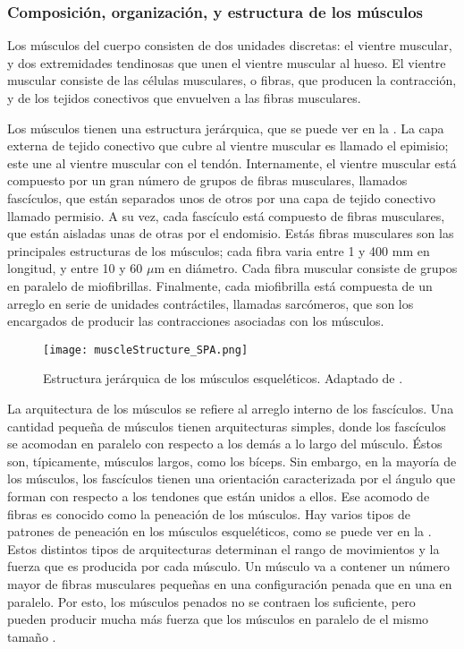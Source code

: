 \subsubsection{Composición, organización, y estructura de los músculos}
\label{sec:muscleComposition}

Los músculos del cuerpo consisten de dos unidades discretas: el vientre muscular, y dos extremidades tendinosas que unen el vientre muscular al hueso. El vientre muscular consiste de las células musculares, o fibras, que producen la contracción, y de los tejidos conectivos que envuelven a las fibras musculares. 

Los músculos tienen una estructura jerárquica, que se puede ver en la . La capa externa de tejido conectivo que cubre al vientre muscular es llamado el epimisio; este une al vientre muscular con el tendón. Internamente, el vientre muscular está compuesto por un gran número de grupos de fibras musculares, llamados fascículos, que están separados unos de otros por una capa de tejido conectivo llamado permisio. A su vez, cada fascículo está compuesto de fibras musculares, que están aisladas unas de otras por el endomisio. Estás fibras musculares son las principales estructuras de los músculos; cada fibra varia entre 1 y 400 mm en longitud, y entre 10 y 60 $\mu$m en diámetro. Cada fibra muscular consiste de grupos en paralelo de miofibrillas. Finalmente, cada miofibrilla está compuesta de un arreglo en serie de unidades contráctiles, llamadas sarcómeros, que son los encargados de producir las contracciones asociadas con los músculos. 

\begin{figure}[!ht]
	\centering
		\texttt{[image: muscleStructure\_SPA.png]}
	\caption[Estructura jerárquica de músculos esqueléticos.]{Estructura jerárquica de los músculos esqueléticos. Adaptado de \citep{lee2010survey}.}
	\label{fig:muscleStructure}
\end{figure}

La arquitectura de los músculos se refiere al arreglo interno de los fascículos. Una cantidad pequeña de músculos tienen arquitecturas simples, donde los fascículos se acomodan en paralelo con respecto a los demás a lo largo del músculo. Éstos son, típicamente, músculos largos, como los bíceps. Sin embargo, en la mayoría de los músculos, los fascículos tienen una orientación caracterizada por el ángulo que forman con respecto a los tendones que están unidos a ellos. Ese acomodo de fibras es conocido como la peneación de los músculos. Hay varios tipos de patrones de peneación en los músculos esqueléticos, como se puede ver en la . Estos distintos tipos de arquitecturas determinan el rango de movimientos y la fuerza que es producida por cada músculo. Un músculo va a contener un número mayor de fibras musculares pequeñas en una configuración penada que en una en paralelo. Por esto, los músculos penados no se contraen los suficiente, pero pueden producir mucha más fuerza que los músculos en paralelo de el mismo tamaño \cite{oatis2009kynesiology}.

